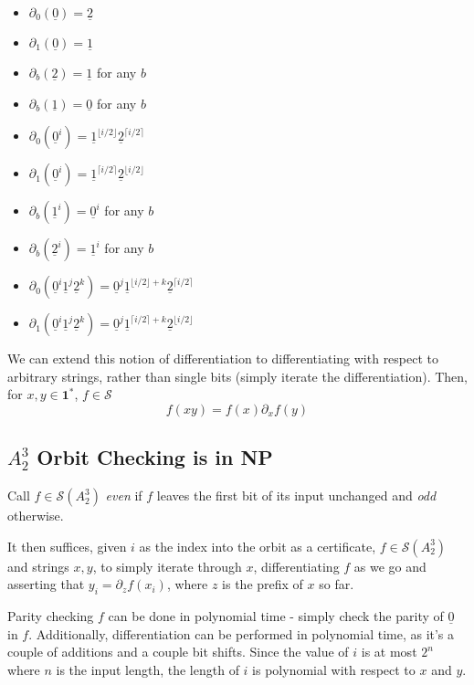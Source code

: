 \documentclass[11pt]{article}
\theoremstyle{pleasant}
\newcommand{\0}{\underline{0}}
\newcommand{\1}{\underline{1}}
\newcommand{\2}{\underline{2}}
\renewcommand{\S}{\mathcal{S}}
\begin{document}
\begin{multicols}{2}
\begin{itemize}
\item $\partial_0(\0) = \2$
\item $\partial_1(\0) = \1$
\item $\partial_b(\2) = \1$ for any $b$
\item $\partial_b(\1) = \0$ for any $b$
\end{itemize}

\begin{itemize}
\item $\partial_0(\0^i) = \1^{\lfloor i / 2 \rfloor}\2^{\lceil i / 2 \rceil}$
\item $\partial_1(\0^i) = \1^{\lceil i / 2 \rceil}\2^{\lfloor i / 2 \rfloor}$
\item $\partial_b(\1^i) = \0^i$ for any $b$
\item $\partial_b(\2^i) = \1^i$ for any $b$
\item $\partial_0(\0^i\1^j\2^k) = \0^j\1^{\lfloor i / 2 \rfloor+k}\2^{\lceil i / 2 \rceil}$
\item $\partial_1(\0^i\1^j\2^k) = \0^j\1^{\lceil i / 2 \rceil+k}\2^{\lfloor i / 2 \rfloor}$
\end{itemize}
\end{multicols}
We can extend this notion of differentiation to differentiating with respect to arbitrary strings, rather than single bits (simply iterate the differentiation). Then, for $x, y \in \textbf{1}^*$, $f \in \S$
$$f(xy) = f(x) \partial_xf(y)$$

\subsection*{$A^3_2$ Orbit Checking is in NP}

Call $f \in \S(A^3_2)$ \textit{even} if $f$ leaves the first bit of its input unchanged and \textit{odd} otherwise.

It then suffices, given $i$ as the index into the orbit as a certificate, $f \in \S(A^3_2)$ and strings $x, y$, to simply iterate through $x$, differentiating $f$ as we go and asserting that $y_i = \partial_zf(x_i)$, where $z$ is the prefix of $x$ so far.

Parity checking $f$ can be done in polynomial time - simply check the parity of $\0$ in $f$. Additionally, differentiation can be performed in polynomial time, as it's a couple of additions and a couple bit shifts. Since the value of $i$ is at most $2^n$ where $n$ is the input length, the length of $i$ is polynomial with respect to $x$ and $y$.
\end{document}
